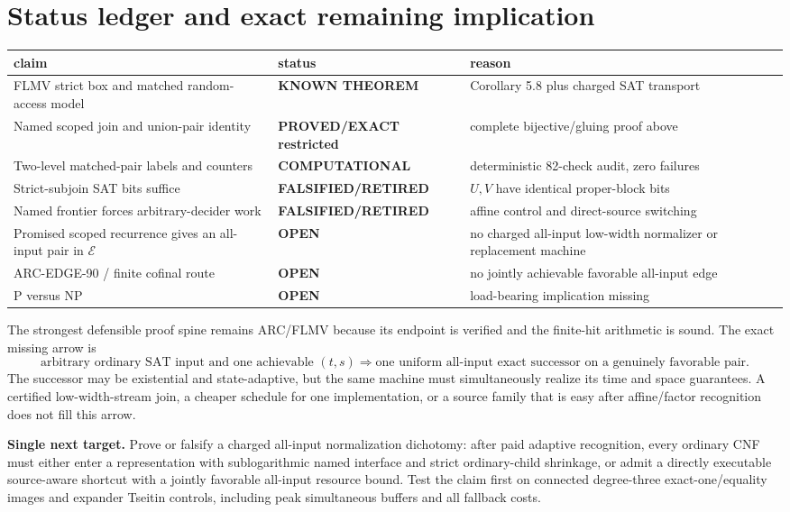 \documentclass[11pt]{article}
\newcommand{\OPEN}{\textbf{OPEN}}
\begin{document}
\section{Status ledger and exact remaining implication}
\begin{center}\small
\begin{tabular}{p{.38\linewidth}p{.18\linewidth}p{.34\linewidth}}
\toprule
claim & status & reason\\\midrule
FLMV strict box and matched random-access model & \textbf{KNOWN THEOREM} & Corollary 5.8 plus charged SAT transport\\
Named scoped join and union-pair identity & \textbf{PROVED/EXACT restricted} & complete bijective/gluing proof above\\
Two-level matched-pair labels and counters & \textbf{COMPUTATIONAL} & deterministic 82-check audit, zero failures\\
Strict-subjoin SAT bits suffice & \textbf{FALSIFIED/RETIRED} & $U,V$ have identical proper-block bits\\
Named frontier forces arbitrary-decider work & \textbf{FALSIFIED/RETIRED} & affine control and direct-source switching\\
Promised scoped recurrence gives an all-input pair in $\mathcal E$ & \OPEN & no charged all-input low-width normalizer or replacement machine\\
ARC-EDGE-90 / finite cofinal route & \OPEN & no jointly achievable favorable all-input edge\\
P versus NP & \OPEN & load-bearing implication missing\\
\bottomrule
\end{tabular}
\end{center}

The strongest defensible proof spine remains ARC/FLMV because its endpoint is
verified and the finite-hit arithmetic is sound.  The exact missing arrow is
\[
 \boxed{\text{arbitrary ordinary SAT input and one achievable }(t,s)
 \Longrightarrow
 \text{one uniform all-input exact successor on a genuinely favorable pair}.}
\]
The successor may be existential and state-adaptive, but the same machine must
simultaneously realize its time and space guarantees.  A certified
low-width-stream join, a cheaper schedule for one implementation, or a source
family that is easy after affine/factor recognition does not fill this arrow.

\textbf{Single next target.}  Prove or falsify a charged all-input
normalization dichotomy: after paid adaptive recognition, every ordinary CNF
must either enter a representation with sublogarithmic named interface and
strict ordinary-child shrinkage, or admit a directly executable source-aware
shortcut with a jointly favorable all-input resource bound.  Test the claim
first on connected degree-three exact-one/equality images and expander Tseitin
controls, including peak simultaneous buffers and all fallback costs.
\end{document}
